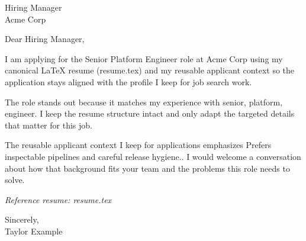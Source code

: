 \documentclass[11pt]{letter}
\begin{document}
\begin{letter}{Hiring Manager \\ Acme Corp}
\opening{Dear Hiring Manager,}

I am applying for the Senior Platform Engineer role at Acme Corp using my canonical LaTeX resume (resume.tex) and my reusable applicant context so the application stays aligned with the profile I keep for job search work.

The role stands out because it matches my experience with senior, platform, engineer. I keep the resume structure intact and only adapt the targeted details that matter for this job.

The reusable applicant context I keep for applications emphasizes Prefers inspectable pipelines and careful release hygiene.. I would welcome a conversation about how that background fits your team and the problems this role needs to solve.



\noindent\emph{Reference resume: resume.tex}

\closing{Sincerely, \\ Taylor Example}
\end{letter}
\end{document}
